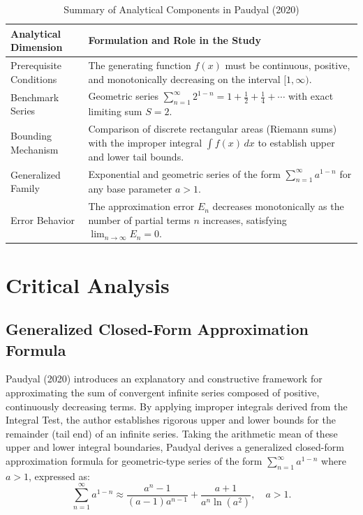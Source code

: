 \documentclass[11pt, a4paper]{article}
\begin{document}
\begin{table}[htbp]
\centering
\caption{Summary of Analytical Components in Paudyal (2020)}
\label{tab:summary}
\vspace{0.2cm}
\begin{tabularx}{\textwidth}{l X}
\toprule
\textbf{Analytical Dimension} & \textbf{Formulation and Role in the Study} \\
\midrule
Prerequisite Conditions & The generating function $f(x)$ must be continuous, positive, and monotonically decreasing on the interval $[1, \infty)$. \\
\addlinespace
Benchmark Series & Geometric series $\sum_{n=1}^{\infty} 2^{1-n} = 1 + \frac{1}{2} + \frac{1}{4} + \cdots$ with exact limiting sum $S = 2$. \\
\addlinespace
Bounding Mechanism & Comparison of discrete rectangular areas (Riemann sums) with the improper integral $\int f(x)\,dx$ to establish upper and lower tail bounds. \\
\addlinespace
Generalized Family & Exponential and geometric series of the form $\sum_{n=1}^{\infty} a^{1-n}$ for any base parameter $a > 1$. \\
\addlinespace
Error Behavior & The approximation error $E_n$ decreases monotonically as the number of partial terms $n$ increases, satisfying $\lim_{n \to \infty} E_n = 0$. \\
\bottomrule
\end{tabularx}
\end{table}

\section{Critical Analysis}

\subsection{Generalized Closed-Form Approximation Formula}

Paudyal (2020) introduces an explanatory and constructive framework for approximating the sum of convergent infinite series composed of positive, continuously decreasing terms. By applying improper integrals derived from the Integral Test, the author establishes rigorous upper and lower bounds for the remainder (tail end) of an infinite series. Taking the arithmetic mean of these upper and lower integral boundaries, Paudyal derives a generalized closed-form approximation formula for geometric-type series of the form $\sum_{n=1}^{\infty} a^{1-n}$ where $a > 1$, expressed as:
\begin{equation}
    \sum_{n=1}^{\infty} a^{1-n} \approx \frac{a^{n}-1}{(a-1)a^{n-1}} + \frac{a+1}{a^{n}\ln(a^{2})}, \quad a > 1.
    \label{eq:general_approx}
\end{equation}
\end{document}
